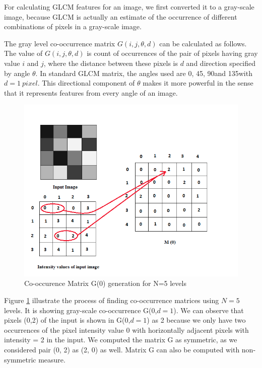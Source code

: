 For calculating GLCM features for an image, we first converted it to a gray-scale image, because GLCM is actually an estimate of 
the occurrence of different combinations of pixels in a gray-scale image. 

The gray level co-occurrence matrix $G(i,j,\theta, d)$ can be calculated as follows. The value of $G(i,j,\theta, d)$ is count of occurrences of the pair of pixels having gray value $i$ and $j$, where the distance between these pixels is $d$ and direction specified by angle $\theta$. In standard GLCM matrix, the angles used are 0\textdegree, 45\textdegree, 90\textdegree and 135\textdegree with 
$d=1\ pixel$. This directional component of $\theta$ makes it more powerful in the sense that it represents features from every angle of 
an image.
 \begin{center}
\begin{figure}
\centering
\includegraphics[width=\linewidth]{./Pictures/GLCM/process.jpg}
\caption{Co-occurence Matrix G(0\textdegree) generation for N=5 levels }
\label{fig:glcmMatrix}
\end{figure}
\end{center}
Figure \ref{fig:glcmMatrix} illustrate the process of finding co-occurrence matrices using $N=5$ levels. It is showing gray-scale co-occurrence G(0\textdegree,$d=1$). We can observe that pixels (0,2) of the input is shown in G(0\textdegree,$d=1$) as 2 because we only have two occurrences of the pixel intensity value 0 with horizontally adjacent pixels with intensity = 2 in the input. We computed the matrix  
G as symmetric, as we considered pair (0, 2) as (2, 0) as well. Matrix G can also be computed with non-symmetric measure.

